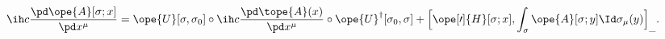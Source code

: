 \begin{equation}	\label{12.38}
\ih c \frac{\pd\ope{A}[\sigma;x]}{\pd x^\mu}
=
\ope{U}[\sigma,\sigma_0]
\circ \ih c\frac{\pd\tope{A}(x)}{\pd x^\mu} \circ
\ope{U}^\dag[\sigma_0,\sigma]
+ \Bigl[\ope[\prime]{H}[\sigma;x] ,
	\int_\sigma \ope{A}[\sigma;y] \Id\sigma_\mu(y) \Bigr]_{\_} .
	\end{equation}

